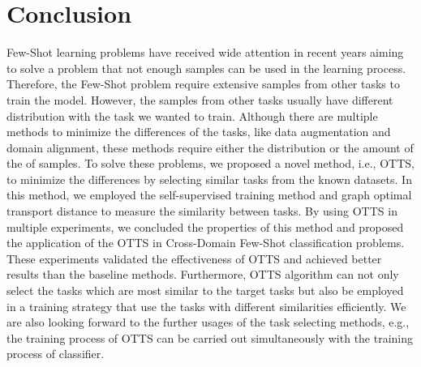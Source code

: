 \documentclass[10pt,journal,compsoc]{IEEEtran}
\begin{document}




\section{Conclusion}
Few-Shot learning problems have received wide attention in recent years aiming to solve a problem that not enough samples can be used in the learning process. Therefore, the Few-Shot problem require extensive samples from other tasks to train the model. However, the samples from other tasks usually have different distribution with the task we wanted to train. Although there are multiple methods to minimize the differences of the tasks, like data augmentation and domain alignment, these methods require either the distribution or the amount of the of samples.
To solve these problems, we proposed a novel method, i.e., OTTS, to minimize the differences by selecting similar tasks from the known datasets. In this method, we employed the self-supervised training method and graph optimal transport distance to measure the similarity between tasks. By using OTTS in multiple experiments, we concluded the properties of this method and proposed the application of the OTTS in Cross-Domain Few-Shot classification problems. These experiments validated the effectiveness of OTTS and achieved better results than the baseline methods. Furthermore, OTTS algorithm can not only select the tasks which are most similar to the target tasks but also be employed in a training strategy that use the tasks with different similarities efficiently. We are also looking forward to the further usages of the task selecting methods, e.g., the training process of OTTS can be carried out simultaneously with the training process of classifier.





\end{document}
